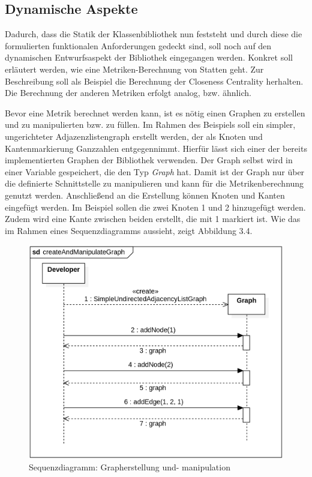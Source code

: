 \documentclass[a4paper,12pt,ngerman,chapterprefix=false,listof=totoc,bibliography=totoc]{scrreprt}
\begin{document}
{{\subsection{Dynamische Aspekte}
{
Dadurch, dass die Statik der Klassenbibliothek nun feststeht und durch diese die formulierten funktionalen Anforderungen gedeckt sind, soll noch auf den dynamischen Entwurfsaspekt der Bibliothek eingegangen werden. Konkret soll erläutert werden, wie eine Metriken-Berechnung von Statten geht. Zur Beschreibung soll als Beispiel die Berechnung der Closeness Centrality herhalten. Die Berechnung der anderen Metriken erfolgt analog, bzw. ähnlich.

Bevor eine Metrik berechnet werden kann, ist es nötig einen Graphen zu erstellen und zu manipulierten bzw. zu füllen. Im Rahmen des Beispiels soll ein simpler, ungerichteter Adjazenzlistengraph erstellt werden, der als Knoten und Kantenmarkierung Ganzzahlen entgegennimmt. Hierfür lässt sich einer der bereits implementierten Graphen der Bibliothek verwenden. Der Graph selbst wird in einer Variable gespeichert, die den Typ \textit{Graph} hat. Damit ist der Graph nur über die definierte Schnittstelle zu manipulieren und kann für die Metrikenberechnung genutzt werden. Anschließend an die Erstellung können Knoten und Kanten eingefügt werden. Im Beispiel sollen die zwei Knoten 1 und 2 hinzugefügt werden. Zudem wird eine Kante zwischen beiden erstellt, die mit 1 markiert ist. Wie das im Rahmen eines Sequenzdiagramms aussieht, zeigt Abbildung 3.4.
\begin{figure}[ht!]
	\centering
	\includegraphics[scale=.38]{Abbildungen/UML/sequence_graph_creation.png}
	\caption[Sequenzdiagramm: Grapherstellung und- manipulation]{Sequenzdiagramm: Grapherstellung und- manipulation}
\end{figure}

}}}
\end{document}
